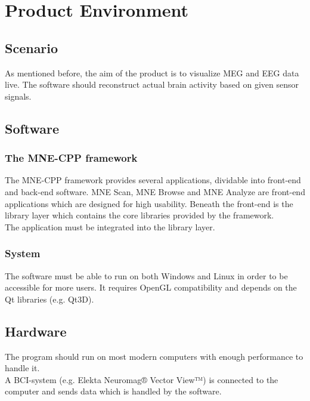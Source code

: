 \section {Product Environment}
\subsection{Scenario}
As mentioned before, the aim of the product is to visualize MEG and EEG data live. The software should reconstruct actual brain activity based on given sensor signals.


\subsection{Software}
\subsubsection{The MNE-CPP framework}The MNE-CPP framework provides several applications, dividable into front-end and back-end software. MNE Scan, MNE Browse and MNE Analyze are front-end applications which are designed for high usability.
Beneath the front-end is the library layer which contains the core libraries provided by the framework.\\
The application must be integrated into the library layer.
\subsubsection{System}
The software must be able to run on both Windows and Linux in order to be accessible for more users. It requires OpenGL compatibility and depends on the Qt libraries (e.g. Qt3D).
\subsection{Hardware}
The program should run on most modern computers with enough performance to handle it. \\
A BCI-system (e.g. Elekta Neuromag® Vector View™) is connected to the computer and sends data which is handled by the software.